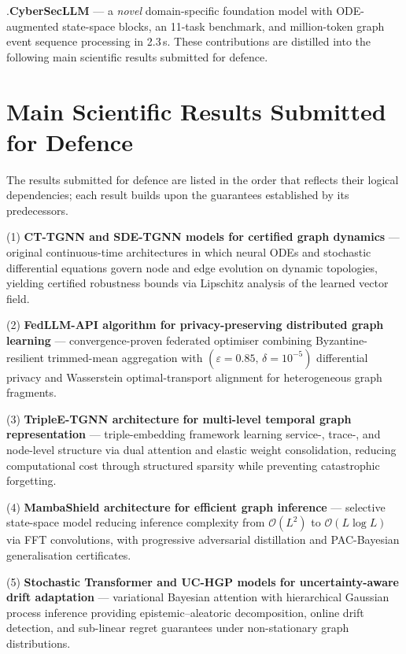 .\quad \textbf{CyberSecLLM} --- a \emph{novel} domain-specific foundation model with ODE-augmented state-space blocks, an 11-task benchmark, and million-token graph event sequence processing in 2.3\,s. These contributions are distilled into the following main scientific results submitted for defence.


\section*{Main Scientific Results Submitted for Defence}

The results submitted for defence are listed in the order that reflects their logical dependencies; each result builds upon the guarantees established by its predecessors.

(1) \textbf{CT-TGNN and SDE-TGNN models for certified graph dynamics} --- original continuous-time architectures in which neural ODEs and stochastic differential equations govern node and edge evolution on dynamic topologies, yielding certified robustness bounds via Lipschitz analysis of the learned vector field.

(2) \textbf{FedLLM-API algorithm for privacy-preserving distributed graph learning} --- convergence-proven federated optimiser combining Byzantine-resilient trimmed-mean aggregation with $(\varepsilon{=}0.85,\,\delta{=}10^{-5})$ differential privacy and Wasserstein optimal-transport alignment for heterogeneous graph fragments.

(3) \textbf{TripleE-TGNN architecture for multi-level temporal graph representation} --- triple-embedding framework learning service-, trace-, and node-level structure via dual attention and elastic weight consolidation, reducing computational cost through structured sparsity while preventing catastrophic forgetting.

(4) \textbf{MambaShield architecture for efficient graph inference} --- selective state-space model reducing inference complexity from $\mathcal{O}(L^{2})$ to $\mathcal{O}(L\log L)$ via FFT convolutions, with progressive adversarial distillation and PAC-Bayesian generalisation certificates.

(5) \textbf{Stochastic Transformer and UC-HGP models for uncertainty-aware drift adaptation} --- variational Bayesian attention with hierarchical Gaussian process inference providing epistemic--aleatoric decomposition, online drift detection, and sub-linear regret guarantees under non-stationary graph distributions.

